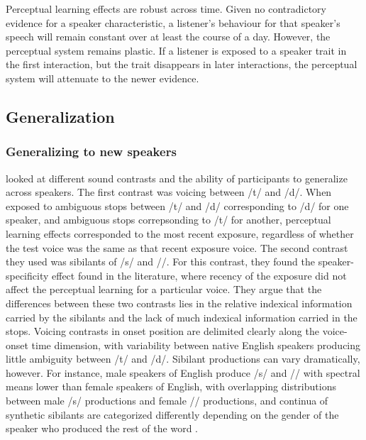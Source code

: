 Perceptual learning effects are robust across time.  
Given no contradictory evidence for a speaker characteristic, a listener's behaviour for that speaker's speech will remain constant over at least the course of a day. 
However, the perceptual system remains plastic.  
If a listener is exposed to a speaker trait in the first interaction, but the trait disappears in later interactions, the perceptual system will attenuate to the newer evidence.

\subsection{Generalization}
\label{sec:generalization}

\subsubsection{Generalizing to new speakers}
\label{sec:speakergeneralization}

\citet{Kraljic2007} looked at different sound contrasts and the ability of participants to generalize across speakers.  
The first contrast was voicing between /t/ and /d/.  
When exposed to ambiguous stops between /t/ and /d/ corresponding to /d/ for one speaker, and ambiguous stops correpsonding to /t/ for another, perceptual learning effects corresponded to the most recent exposure, regardless of whether the test voice was the same as that recent exposure voice.  
The second contrast they used was sibilants of /s/ and /\textesh/. 
For this contrast, they found the speaker-specificity effect found in the literature, where recency of the exposure did not affect the perceptual learning for a particular voice.
They argue that the differences between these two contrasts lies in the relative indexical information carried by the sibilants and the lack of much indexical information carried in the stops.
Voicing contrasts in onset position are delimited clearly along the voice-onset time dimension, with variability between native English speakers producing little ambiguity between /t/ and /d/.
Sibilant productions can vary dramatically, however.
For instance, male speakers of English produce /s/ and /\textesh/ with spectral means lower than female speakers of English, with overlapping distributions between male /s/ productions and female /\textesh/ productions, and continua of synthetic sibilants are categorized differently depending on the gender of the speaker who produced the rest of the word \citep{Strand1996}.  

